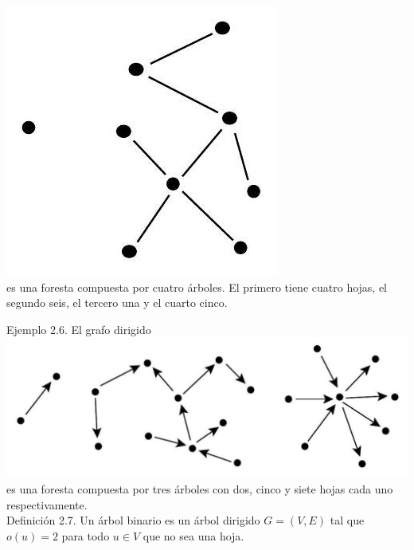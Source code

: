 \documentclass[10pt]{article}
\begin{document}
\includegraphics[max width=\textwidth, center]{2025_09_05_93c7c1835f249f70c0eeg-04(1)}\\
es una foresta compuesta por cuatro árboles. El primero tiene cuatro hojas, el segundo seis, el tercero una y el cuarto cinco.

Ejemplo 2.6. El grafo dirigido\\
\includegraphics[max width=\textwidth, center]{2025_09_05_93c7c1835f249f70c0eeg-04(3)}\\
es una foresta compuesta por tres árboles con dos, cinco y siete hojas cada uno respectivamente.\\
Definición 2.7. Un árbol binario es un árbol dirigido $G=(V, E)$ tal que $o(u)=2$ para todo $u \in V$ que no sea una hoja.
\end{document}
